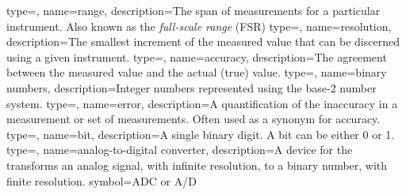 
{type=\thisgls,
name=range,
description={The span of measurements for a particular instrument.  Also known as the \emph{full-scale range} (FSR)}
}
{type=\thisgls,
name=resolution,
description={The smallest increment of the measured value that can be discerned using a given instrument.}
}
{type=\thisgls,
name=accuracy,
description={The agreement between the measured value and the actual (true) value.}
}
{type=\thisgls,
name=binary numbers,
description={Integer numbers represented using the base-2 number system.}
}
{type=\thisgls,
name=error,
description={A quantification of the inaccuracy in a measurement or set of measurements.  Often used as a synonym for accuracy.}
}
{type=\thisgls,
name=bit,
description={A single binary digit.  A bit can be either 0 or 1.}
}
{type=\thisgls,
name=analog-to-digital converter,
description={A device for the transforms an analog signal, with infinite resolution, to a binary number, with finite resolution.}
symbol={ADC or A/D}
}
